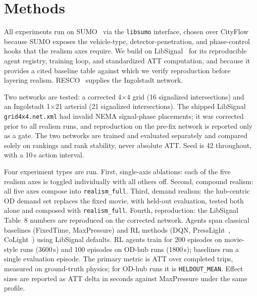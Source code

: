 \documentclass[conference]{IEEEtran}
\newcommand{\realismfull}{\texttt{realism\_full}}
\begin{document}
\section{Methods}

All experiments run on SUMO~\cite{lopez2018sumo} via the \texttt{libsumo} interface, chosen over CityFlow~\cite{zhang2019cityflow} because SUMO exposes the vehicle-type, detector-penetration, and phase-control hooks that the realism axes require. We build on LibSignal~\cite{mei2023libsignal} for its reproducible agent registry, training loop, and standardized ATT computation, and because it provides a cited baseline table against which we verify reproduction before layering realism. RESCO~\cite{ault2021resco} supplies the Ingolstadt network.

Two networks are tested: a corrected 4$\times$4 grid (16 signalized intersections) and an Ingolstadt 1$\times$21 arterial (21 signalized intersections). The shipped LibSignal \texttt{grid4x4.net.xml} had invalid NEMA signal-phase placements; it was corrected prior to all realism runs, and reproduction on the pre-fix network is reported only as a gate. The two networks are trained and evaluated separately and compared solely on rankings and rank stability, never absolute ATT. Seed is 42 throughout, with a 10\,s action interval.

Four experiment types are run. First, single-axis ablations: each of the five realism axes is toggled individually with all others off. Second, compound realism: all five axes compose into \realismfull. Third, demand realism: the hub-centric OD demand set replaces the fixed movie, with held-out evaluation, tested both alone and composed with \realismfull. Fourth, reproduction: the LibSignal Table~8 numbers are reproduced on the corrected network. Agents span classical baselines (FixedTime, MaxPressure) and RL methods (DQN, PressLight~\cite{wei2019presslight}, CoLight~\cite{wei2019colight}) using LibSignal defaults. RL agents train for 200 episodes on movie-style runs (3600\,s) and 100 episodes on OD-hub runs (1800\,s); baselines run a single evaluation episode. The primary metric is ATT over completed trips, measured on ground-truth physics; for OD-hub runs it is \texttt{HELDOUT\_MEAN}. Effect sizes are reported as ATT delta in seconds against MaxPressure under the same profile.

\end{document}

